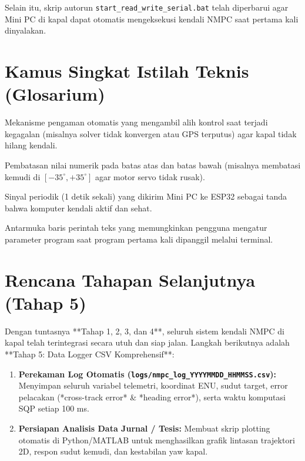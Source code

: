 \documentclass[11pt,a4paper]{article}
\begin{document}
Selain itu, skrip autorun \texttt{start\_read\_write\_serial.bat} telah diperbarui agar Mini PC di kapal dapat otomatis mengeksekusi kendali NMPC saat pertama kali dinyalakan.

\section{Kamus Singkat Istilah Teknis (Glosarium)}

\begin{description}[leftmargin=*, style=nextline]
    \item[\textbf{Fail-Safe}]
    Mekanisme pengaman otomatis yang mengambil alih kontrol saat terjadi kegagalan (misalnya solver tidak konvergen atau GPS terputus) agar kapal tidak hilang kendali.

    \item[\textbf{Clamping}]
    Pembatasan nilai numerik pada batas atas dan batas bawah (misalnya membatasi kemudi di $[-35^\circ, +35^\circ]$ agar motor servo tidak rusak).

    \item[\textbf{Heartbeat (\$HB)}]
    Sinyal periodik (1 detik sekali) yang dikirim Mini PC ke ESP32 sebagai tanda bahwa komputer kendali aktif dan sehat.

    \item[\textbf{Command Line Interface (CLI)}]
    Antarmuka baris perintah teks yang memungkinkan pengguna mengatur parameter program saat program pertama kali dipanggil melalui terminal.
\end{description}

\section{Rencana Tahapan Selanjutnya (Tahap 5)}

Dengan tuntasnya **Tahap 1, 2, 3, dan 4**, seluruh sistem kendali NMPC di kapal telah terintegrasi secara utuh dan siap jalan. Langkah berikutnya adalah **Tahap 5: Data Logger CSV Komprehensif**:

\begin{enumerate}
    \item \textbf{Perekaman Log Otomatis (\texttt{logs/nmpc\_log\_YYYYMMDD\_HHMMSS.csv}):}
    Menyimpan seluruh variabel telemetri, koordinat ENU, sudut target, error pelacakan (*cross-track error* \& *heading error*), serta waktu komputasi SQP setiap 100 ms.
    
    \item \textbf{Persiapan Analisis Data Jurnal / Tesis:}
    Membuat skrip plotting otomatis di Python/MATLAB untuk menghasilkan grafik lintasan trajektori 2D, respon sudut kemudi, dan kestabilan yaw kapal.
\end{enumerate}
\end{document}

